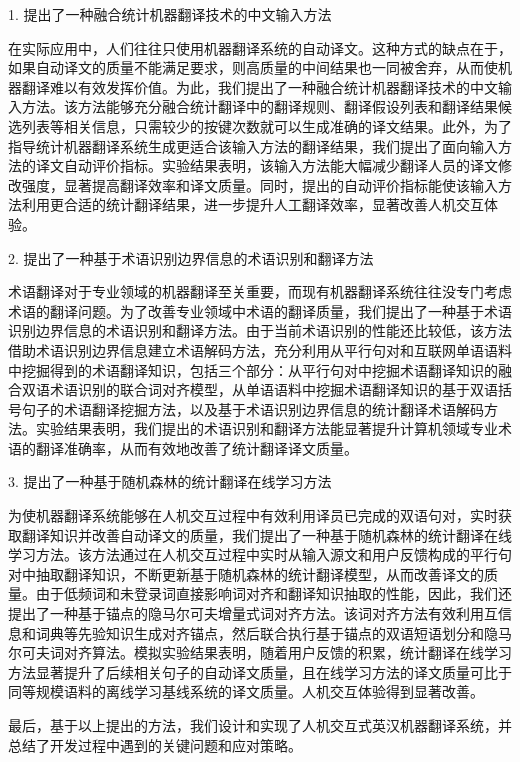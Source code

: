 1. 提出了一种融合统计机器翻译技术的中文输入方法

在实际应用中，人们往往只使用机器翻译系统的自动译文。这种方式的缺点在于，如果自动译文的质量不能满足要求，则高质量的中间结果也一同被舍弃，从而使机器翻译难以有效发挥价值。为此，我们提出了一种融合统计机器翻译技术的中文输入方法。该方法能够充分融合统计翻译中的翻译规则、翻译假设列表和翻译结果候选列表等相关信息，只需较少的按键次数就可以生成准确的译文结果。此外，为了指导统计机器翻译系统生成更适合该输入方法的翻译结果，我们提出了面向输入方法的译文自动评价指标。实验结果表明，该输入方法能大幅减少翻译人员的译文修改强度，显著提高翻译效率和译文质量。同时，提出的自动评价指标能使该输入方法利用更合适的统计翻译结果，进一步提升人工翻译效率，显著改善人机交互体验。

2. 提出了一种基于术语识别边界信息的术语识别和翻译方法

术语翻译对于专业领域的机器翻译至关重要，而现有机器翻译系统往往没专门考虑术语的翻译问题。为了改善专业领域中术语的翻译质量，我们提出了一种基于术语识别边界信息的术语识别和翻译方法。由于当前术语识别的性能还比较低，该方法借助术语识别边界信息建立术语解码方法，充分利用从平行句对和互联网单语语料中挖掘得到的术语翻译知识，包括三个部分：从平行句对中挖掘术语翻译知识的融合双语术语识别的联合词对齐模型，从单语语料中挖掘术语翻译知识的基于双语括号句子的术语翻译挖掘方法，以及基于术语识别边界信息的统计翻译术语解码方法。实验结果表明，我们提出的术语识别和翻译方法能显著提升计算机领域专业术语的翻译准确率，从而有效地改善了统计翻译译文质量。

3. 提出了一种基于随机森林的统计翻译在线学习方法

为使机器翻译系统能够在人机交互过程中有效利用译员已完成的双语句对，实时获取翻译知识并改善自动译文的质量，我们提出了一种基于随机森林的统计翻译在线学习方法。该方法通过在人机交互过程中实时从输入源文和用户反馈构成的平行句对中抽取翻译知识，不断更新基于随机森林的统计翻译模型，从而改善译文的质量。由于低频词和未登录词直接影响词对齐和翻译知识抽取的性能，因此，我们还提出了一种基于锚点的隐马尔可夫增量式词对齐方法。该词对齐方法有效利用互信息和词典等先验知识生成对齐锚点，然后联合执行基于锚点的双语短语划分和隐马尔可夫词对齐算法。模拟实验结果表明，随着用户反馈的积累，统计翻译在线学习方法显著提升了后续相关句子的自动译文质量，且在线学习方法的译文质量可比于同等规模语料的离线学习基线系统的译文质量。人机交互体验得到显著改善。

最后，基于以上提出的方法，我们设计和实现了人机交互式英汉机器翻译系统，并总结了开发过程中遇到的关键问题和应对策略。



